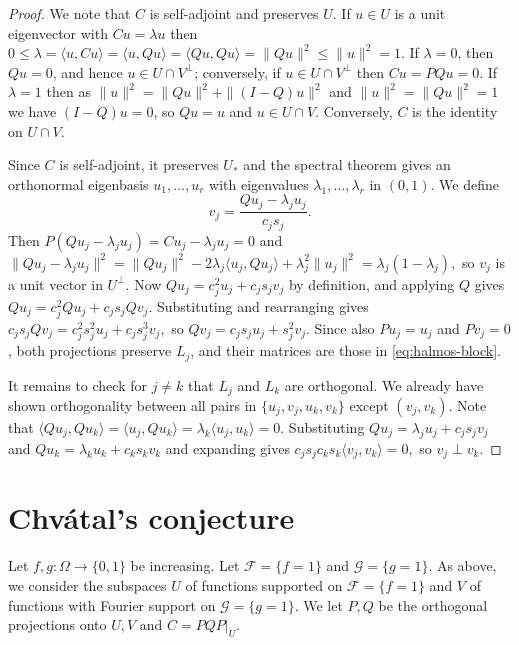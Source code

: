 \documentclass{article}
\theoremstyle{plain}
\theoremstyle{definition}
\newcommand{\mc}[1]{\mathcal{#1}}
\newcommand{\lL}{\lambda}
\newcommand{\OO}{\Omega}
\begin{document}
\begin{proof}
We note that $C$ is self-adjoint and preserves $U$.
If $u\in U$ is a unit eigenvector with $Cu=\lambda u$ then 
\(  0 \le \lambda
 =\langle u,Cu\rangle
 =\langle u,Qu\rangle
 =\langle Qu,Qu\rangle
 =\|Qu\|^2 \le \|u\|^2 = 1 \).
If $\lambda=0$, then $Qu=0$, and hence $u\in U\cap V^\perp$;
conversely, if $u\in U\cap V^\perp$ then $Cu = PQu=0$.
If $\lambda=1$ then as $\|u\|^2=\|Qu\|^2+\|(I-Q)u\|^2$
and $\|u\|^2=\|Qu\|^2=1$ we have $(I-Q)u=0$, so $Qu=u$ and $u\in U\cap V$. 
Conversely, $C$ is the identity on $U\cap V$.  

Since $C$ is self-adjoint, it preserves $U_*$ and the
spectral theorem  gives an orthonormal eigenbasis $u_1,\ldots,u_r$ 
with eigenvalues  $\lL_1,\ldots,\lL_r$ in $(0,1)$. We define
\[
 v_j=\frac{Qu_j-\lambda_j u_j}{c_js_j}.
\]
Then
\(
 P(Qu_j-\lambda_j u_j)
 =Cu_j-\lambda_j u_j
 =0
\)
and
\(
 \|Qu_j-\lambda_j u_j\|^2
 =
 \|Qu_j\|^2
 -2\lambda_j\langle u_j,Qu_j\rangle
 +\lambda_j^2\|u_j\|^2
 =\lambda_j(1-\lambda_j),
\)
so $v_j$ is a unit vector in $U^\perp$.
Now
\(
 Qu_j=c_j^2u_j+c_js_jv_j
\)
by definition, and applying $Q$ gives
\(
 Qu_j =c_j^2Qu_j+c_js_jQv_j.
\)
Substituting and rearranging gives
\(
 c_js_jQv_j
 =c_j^2s_j^2u_j+c_js_j^3v_j,
\)
so
\(
 Qv_j=c_js_ju_j+s_j^2v_j.
\)
Since also $Pu_j=u_j$ and $Pv_j=0$, both projections preserve
$L_j$, and their matrices are those in \eqref{eq:halmos-block}.

It remains to check for $j \ne k$ that $L_j$ and $L_k$ are orthogonal. 
We already have shown orthogonality between all pairs in $\{u_j,v_j,u_k,v_k\}$
except $(v_j,v_k)$. Note that
\(
 \langle Qu_j,Qu_k\rangle
 =\langle u_j,Qu_k\rangle
 =\lambda_k\langle u_j,u_k\rangle
 =0.
\)
Substituting $Qu_j=\lambda_j u_j+c_js_jv_j$
and $Qu_k=\lambda_k u_k+c_ks_kv_k$
and expanding gives 
\(
 c_js_jc_ks_k\langle v_j,v_k\rangle=0,
\)
so $v_j\perp v_k$.
\end{proof}

\section{Chv\'atal's conjecture}\label{sec:chvatal}

Let $f,g:\OO \to \{0,1\}$ be increasing. Let $\mc F=\{f=1\}$ and $\mc G=\{g=1\}$.
As above, we consider the subspaces $U$ of functions supported on $\mc F=\{f=1\}$ 
and $V$ of functions with Fourier support on $\mc G=\{g=1\}$.
We let $P,Q$ be the orthogonal projections onto $U,V$ and $C=PQP|_U$.
\end{document}
